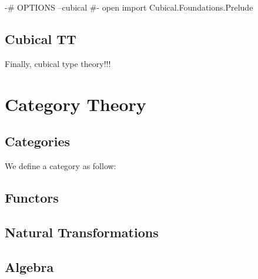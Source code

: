 \begin{code}[hide]
{-# OPTIONS --cubical #-}
open import Cubical.Foundations.Prelude
\end{code}

\subsection*{Cubical TT}

Finally, cubical type theory!!!

\section{Category Theory}

\subsection*{Categories}

We define a category as follow:



\subsection*{Functors}


\subsection*{Natural Transformations}


\subsection*{Algebra}

